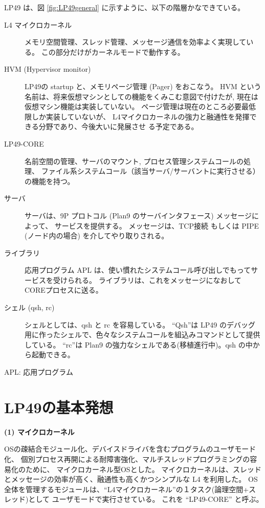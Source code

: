   LP49 は、図 \ref{fig:LP49general} に示すように、以下の階層かなできている。

\begin{description}     
\item[L4 マイクロカーネル]
        メモリ空間管理、スレッド管理、メッセージ通信を効率よく実現している。
       この部分だけがカーネルモードで動作する。
    
\item[HVM (Hypervisor monitor)]
        LP49の startup と、メモリページ管理 (Pager) をおこなう。
        HVM という名前は、将来仮想マシンとしての機能をくみこむ意図で付けたが, 
        現在は仮想マシン機能は実装していない。
        ページ管理は現在のところ必要最低限しか実装していないが、
         L4マイクロカーネルの強力と融通性を発揮できる分野であり、今後大いに発展させ
        る予定である。
        
\item[LP49-CORE]
        名前空間の管理、サーバのマウント, 
        プロセス管理システムコールの処理、 
        ファイル系システムコール（該当サーバ/サーバントに実行させる）
        の機能を持つ。
    
\item[サーバ]
        サーバは、9P プロトコル (Plan9 のサーバインタフェース) メッセージによって、
        サービスを提供する。 
        メッセージは、TCP接続 もしくは PIPE (ノード内の場合) を介してやり取りされる。
    
\item[ライブラリ]
       応用プログラム APL は、使い慣れたシステムコール呼び出しでもってサービスを受けられる。
      ライブラリは、これをメッセージになおして COREプロセスに送る。
    
\item[シェル (qsh, rc)]
        シェルとしては、qsh と rc を容易している。
        ``Qsh''は LP49 のデバッグ用に作ったシェルで、色々なシステムコールを組込みコマンドとして提供している。
        ``rc''は Plan9 の強力なシェルである(移植進行中)。qsh の中から起動できる。
   
\item[APL: 応用プログラム]
\end{description}


\section{LP49の基本発想}

{\bf\flushleft (1) マイクロカーネル}

   OSの疎結合モジュール化、デバイスドライバを含むプログラムのユーザモード化、
  個別プロセス再開による耐障害強化、マルチスレッドプログラミングの容易化のために、
  マイクロカーネル型OSとした。
  マイクロカーネルは、スレッドとメッセージの効率が高く、融通性も高くかつシンプルな
  L4 を利用した。
  OS全体を管理するモジュールは、``L4マイクロカーネル''の１タスク(論理空間+スレッド)として
  ユーザモードで実行させている。
  これを ``LP49-CORE'' と呼ぶ。　


